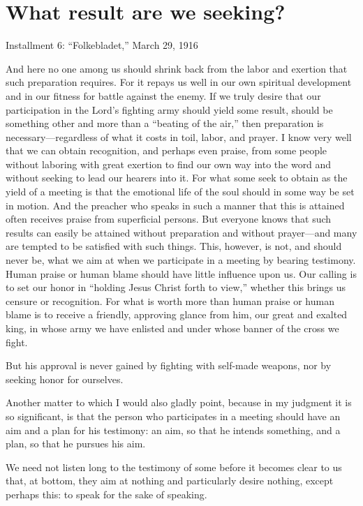 \section{What result are we seeking?}

Installment 6: “Folkebladet,” March 29, 1916

And here no one among us should shrink back from the labor and exertion that such preparation requires. For it repays us well in our own spiritual development and in our fitness for battle against the enemy. If we truly desire that our participation in the Lord’s fighting army should yield some result, should be something other and more than a “beating of the air,” then preparation is necessary—regardless of what it costs in toil, labor, and prayer. I know very well that we can obtain recognition, and perhaps even praise, from some people without laboring with great exertion to find our own way into the word and without seeking to lead our hearers into it. For what some seek to obtain as the yield of a meeting is that the emotional life of the soul should in some way be set in motion. And the preacher who speaks in such a manner that this is attained often receives praise from superficial persons. But everyone knows that such results can easily be attained without preparation and without prayer—and many are tempted to be satisfied with such things. This, however, is not, and should never be, what we aim at when we participate in a meeting by bearing testimony. Human praise or human blame should have little influence upon us. Our calling is to set our honor in “holding Jesus Christ forth to view,” whether this brings us censure or recognition. For what is worth more than human praise or human blame is to receive a friendly, approving glance from him, our great and exalted king, in whose army we have enlisted and under whose banner of the cross we fight.

But his approval is never gained by fighting with self-made weapons, nor by seeking honor for ourselves.

Another matter to which I would also gladly point, because in my judgment it is so significant, is that the person who participates in a meeting should have an aim and a plan for his testimony: an aim, so that he intends something, and a plan, so that he pursues his aim.

We need not listen long to the testimony of some before it becomes clear to us that, at bottom, they aim at nothing and particularly desire nothing, except perhaps this: to speak for the sake of speaking.

